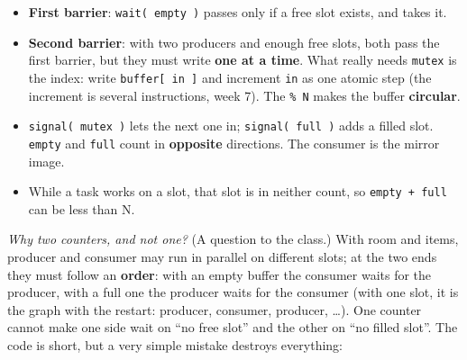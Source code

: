 \begin{itemize}
    \item \textbf{First barrier}: \texttt{wait( empty )} passes only if a free slot exists, and takes it.
    \item \textbf{Second barrier}: with two producers and enough free slots, both pass the first barrier, but they must write \textbf{one at a time}. What really needs \texttt{mutex} is the index: write \texttt{buffer[ in ]} and increment \texttt{in} as one atomic step (the increment is several instructions, week 7). The \texttt{\% N} makes the buffer \textbf{circular}.
    \item \texttt{signal( mutex )} lets the next one in; \texttt{signal( full )} adds a filled slot. \texttt{empty} and \texttt{full} count in \textbf{opposite} directions. The consumer is the mirror image.
    \item While a task works on a slot, that slot is in neither count, so \texttt{empty + full} can be less than N.
\end{itemize}
\emph{Why two counters, and not one?} (A question to the class.) With room and items, producer and consumer may run in parallel on different slots; at the two ends they must follow an \textbf{order}: with an empty buffer the consumer waits for the producer, with a full one the producer waits for the consumer (with one slot, it is the graph with the restart: producer, consumer, producer, \dots). One counter cannot make one side wait on ``no free slot'' and the other on ``no filled slot''. The code is short, but a very simple mistake destroys everything:

